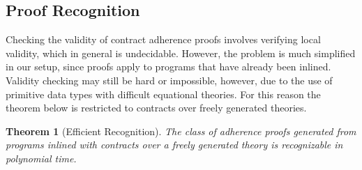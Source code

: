 \documentclass[10pt,twocolumn]{article}
\newtheorem{theorem}{Theorem}
\begin{document}
\subsection{Proof Recognition}
Checking the validity of contract adherence proofs involves verifying 
local validity, which in general is undecidable. However, the problem 
is much simplified in our setup, since proofs apply to programs that 
have already been inlined. Validity checking may still be hard or impossible, 
however, due to the use of primitive data types with difficult equational 
theories. For this reason the theorem below is restricted to contracts over
freely generated theories.
\begin{theorem}[Efficient Recognition]\label{thm:eff_recog}
The class of adherence proofs generated from programs inlined with contracts
over a freely generated theory is recognizable in polynomial time.
\end{theorem}
\end{document}

